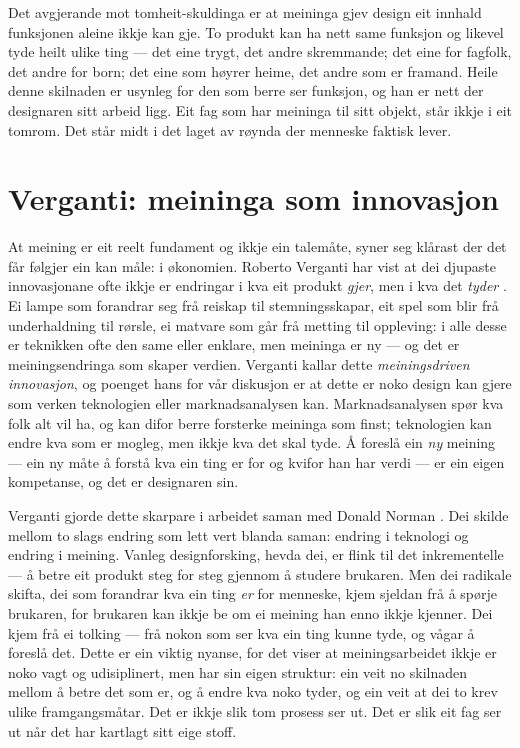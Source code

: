 Det avgjerande mot tomheit-skuldinga er at meininga gjev design eit innhald funksjonen aleine ikkje kan gje. To produkt kan ha nett same funksjon og likevel tyde heilt ulike ting — det eine trygt, det andre skremmande; det eine for fagfolk, det andre for born; det eine som høyrer heime, det andre som er framand. Heile denne skilnaden er usynleg for den som berre ser funksjon, og han er nett der designaren sitt arbeid ligg. Eit fag som har meininga til sitt objekt, står ikkje i eit tomrom. Det står midt i det laget av røynda der menneske faktisk lever.

\section{Verganti: meininga som innovasjon}

At meining er eit reelt fundament og ikkje ein talemåte, syner seg klårast der det får følgjer ein kan måle: i økonomien. Roberto Verganti har vist at dei djupaste innovasjonane ofte ikkje er endringar i kva eit produkt \emph{gjer}, men i kva det \emph{tyder} \autocite{verganti2009}. Ei lampe som forandrar seg frå reiskap til stemningsskapar, eit spel som blir frå underhaldning til rørsle, ei matvare som går frå metting til oppleving: i alle desse er teknikken ofte den same eller enklare, men meininga er ny — og det er meiningsendringa som skaper verdien. Verganti kallar dette \emph{meiningsdriven innovasjon}, og poenget hans for vår diskusjon er at dette er noko design kan gjere som verken teknologien eller marknadsanalysen kan. Marknadsanalysen spør kva folk alt vil ha, og kan difor berre forsterke meininga som finst; teknologien kan endre kva som er mogleg, men ikkje kva det skal tyde. Å foreslå ein \emph{ny} meining — ein ny måte å forstå kva ein ting er for og kvifor han har verdi — er ein eigen kompetanse, og det er designaren sin.

Verganti gjorde dette skarpare i arbeidet saman med Donald Norman \autocite{norman2014incremental}. Dei skilde mellom to slags endring som lett vert blanda saman: endring i teknologi og endring i meining. Vanleg designforsking, hevda dei, er flink til det inkrementelle — å betre eit produkt steg for steg gjennom å studere brukaren. Men dei radikale skifta, dei som forandrar kva ein ting \emph{er} for menneske, kjem sjeldan frå å spørje brukaren, for brukaren kan ikkje be om ei meining han enno ikkje kjenner. Dei kjem frå ei tolking — frå nokon som ser kva ein ting kunne tyde, og vågar å foreslå det. Dette er ein viktig nyanse, for det viser at meiningsarbeidet ikkje er noko vagt og udisiplinert, men har sin eigen struktur: ein veit no skilnaden mellom å betre det som er, og å endre kva noko tyder, og ein veit at dei to krev ulike framgangsmåtar. Det er ikkje slik tom prosess ser ut. Det er slik eit fag ser ut når det har kartlagt sitt eige stoff.

